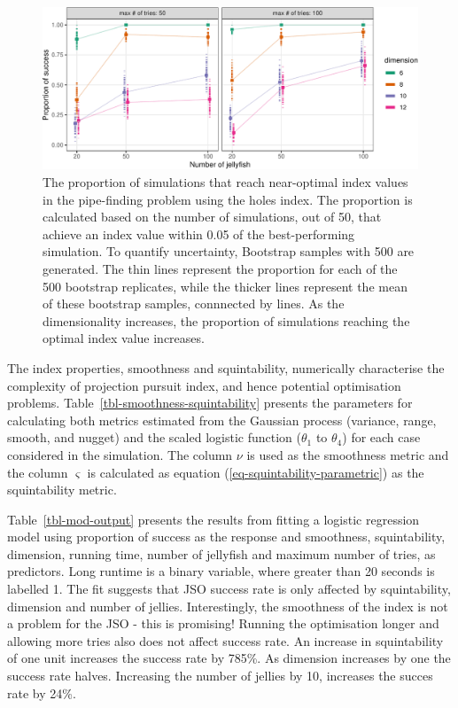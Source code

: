 \documentclass[
  12pt,
]{interact}
\theoremstyle{plain}
\begin{document}
\begin{figure}

{\centering \includegraphics{jso_files/figure-pdf/fig-proportion-1.pdf}

}

\caption{\label{fig-proportion}The proportion of simulations that reach
near-optimal index values in the pipe-finding problem using the holes
index. The proportion is calculated based on the number of simulations,
out of 50, that achieve an index value within 0.05 of the
best-performing simulation. To quantify uncertainty, Bootstrap samples
with 500 are generated. The thin lines represent the proportion for each
of the 500 bootstrap replicates, while the thicker lines represent the
mean of these bootstrap samples, connnected by lines. As the
dimensionality increases, the proportion of simulations reaching the
optimal index value increases.}

\end{figure}

The index properties, smoothness and squintability, numerically
characterise the complexity of projection pursuit index, and hence
potential optimisation problems.
Table~\ref{tbl-smoothness-squintability} presents the parameters for
calculating both metrics estimated from the Gaussian process (variance,
range, smooth, and nugget) and the scaled logistic function
(\(\theta_1\) to \(\theta_4\)) for each case considered in the
simulation. The column \(\nu\) is used as the smoothness metric and the
column \(\varsigma\) is calculated as equation
(\ref{eq-squintability-parametric}) as the squintability metric.

Table~\ref{tbl-mod-output} presents the results from fitting a logistic
regression model using proportion of success as the response and
smoothness, squintability, dimension, running time, number of jellyfish
and maximum number of tries, as predictors. Long runtime is a binary
variable, where greater than 20 seconds is labelled 1. The fit suggests
that JSO success rate is only affected by squintability, dimension and
number of jellies. Interestingly, the smoothness of the index is not a
problem for the JSO - this is promising! Running the optimisation longer
and allowing more tries also does not affect success rate. An increase
in squintability of one unit increases the success rate by 785\%. As
dimension increases by one the success rate halves. Increasing the
number of jellies by 10, increases the succes rate by 24\%.
\end{document}
